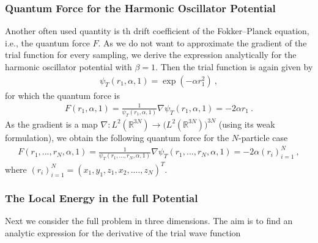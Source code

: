 \documentclass[11pt,a4paper]{article}
\numberwithin{equation}{section}
\begin{document}
\subsubsection{Quantum Force for the Harmonic Oscillator Potential}
%
%
Another often used quantity is th drift coefficient of the Fokker--Planck equation, i.e., the quantum force $F$. 
%
As we do not want to approximate the gradient of the trial function for every sampling, we derive the expression analytically for the harmonic oscillator potential with $\beta =1$.
%
Then the trial function is again given by    
\begin{align*}
\psi_T(r_1,\alpha,1) = \exp(-\alpha r_1^2)~,
\end{align*}
for which the quantum force is
\begin{align*}
F(r_1,\alpha,1) = \frac{1}{\psi_T(r_1,\alpha,1)}\nabla \psi_T(r_1,\alpha,1)
=
-2\alpha r_1~.
\end{align*}
As the gradient is a map $\nabla:L^2(\mathbb{R}^{3N})\to \big(L^2(\mathbb{R}^{3N})\big)^{3N}$ (using its weak formulation), we obtain the following quantum force for the $N$-particle case
\begin{align*}
F(r_1,...,r_N,\alpha,1) = \frac{1}{\psi_T(r_1,...,r_N,\alpha,1)}\nabla \psi_T(r_1,...,r_N,\alpha,1)
=
-2\alpha (r_i)_{i=1}^N~,
\end{align*}
where $(r_i)_{i=1}^N = (x_1, y_1 , z_1, x_2,...., z_N)^T$.

\subsubsection{The Local Energy in the full Potential}
%
%
Next we consider the full problem in three dimensions.
%
The aim is to find an analytic expression for the derivative of the trial wave function
\end{document}
